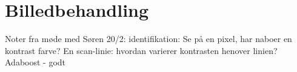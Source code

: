 \section{Billedbehandling}
Noter fra møde med Søren 20/2:
identifikation: Se på en pixel, har naboer en kontrast farve?
En scan-linie: hvordan varierer kontrasten henover linien?
Adaboost - godt